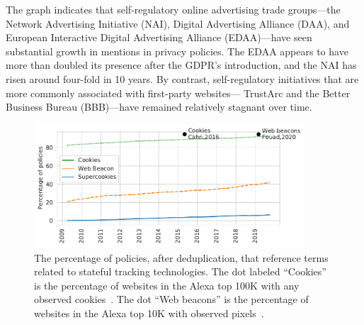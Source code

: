 The graph indicates that self-regulatory online advertising trade groups---the Network Advertising Initiative (NAI), Digital Advertising Alliance (DAA), and European Interactive Digital Advertising Alliance (EDAA)---have seen substantial growth in mentions in privacy policies. The EDAA appears to have more than doubled its presence after the GDPR's introduction, and the NAI has risen around four-fold in 10 years.
By contrast, self-regulatory initiatives that are more commonly associated with first-party websites---
TrustArc and the Better Business Bureau (BBB)---have remained relatively stagnant over time.

\begin{figure}[t]
    \centering
    \includegraphics[width=0.9\textwidth]{chapters/privacypolicies/figures/technologies.pdf}
    \caption{The percentage of policies, after deduplication, that reference terms related to stateful tracking technologies. The dot labeled ``Cookies'' is the percentage of websites in the Alexa top 100K with any observed cookies~\cite{cahn2016empirical}. The dot ``Web beacons'' is the percentage of websites in the Alexa top 10K with observed pixels~\cite{Fouad2020missed}.}
    \label{fig:trackingtech}
\end{figure}

